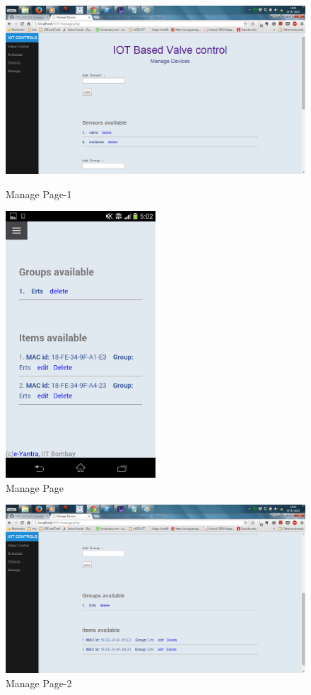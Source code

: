 \documentclass[16pt]{article}
\begin{document}
	\begin{figure}
		\includegraphics[width=1.2\textwidth]{images/manage1.png}
		\caption{Manage Page-1}
		\includegraphics[width=0.5\textwidth]{images/manage_page.png}
		\caption{Manage Page}
		
	\end{figure}
	\begin{figure}
		\includegraphics[width=1.2\textwidth]{images/manage2.png}
		\caption{Manage Page-2}
		
	\end{figure}
	
\end{document}
